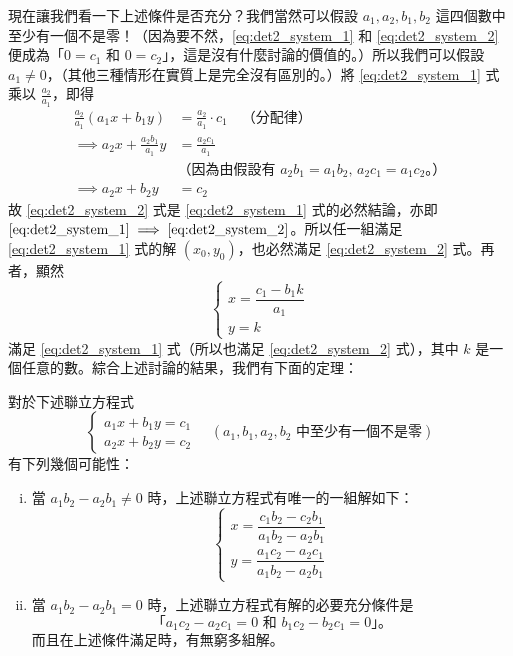 現在讓我們看一下上述條件是否充分？我們當然可以假設 $a_1, a_2, b_1, b_2$ 這四個數中至少有一個不是零！（因為要不然，\eqref{eq:det2_system_1} 和 \eqref{eq:det2_system_2} 便成為「$0=c_1$ 和 $0=c_2$」，這是沒有什麼討論的價值的。）所以我們可以假設 $a_1 \neq 0$，（其他三種情形在實質上是完全沒有區別的。）將 \eqref{eq:det2_system_1} 式乘以 $\frac{a_2}{a_1}$，即得
\begin{align*}
  \frac{a_2}{a_1} (a_1 x + b_1 y) &= \frac{a_2}{a_1} \cdot c_1 \quad \text{（分配律）} \\
  \implies a_2 x + \frac{a_2 b_1}{a_1} y &= \frac{a_2 c_1}{a_1} \\
  &\text{（因為由假設有 $a_2 b_1 = a_1 b_2$, $a_2 c_1 = a_1 c_2$。）} \\
  \implies a_2 x + b_2 y &= c_2
\end{align*}
故 \eqref{eq:det2_system_2} 式是 \eqref{eq:det2_system_1} 式的必然結論，亦即 $\eqref{eq:det2_system_1} \implies \eqref{eq:det2_system_2}$。所以任一組滿足 \eqref{eq:det2_system_1} 式的解 $(x_0, y_0)$，也必然滿足 \eqref{eq:det2_system_2} 式。再者，顯然
\begin{equation*}
\begin{cases}
  x = \dfrac{c_1 - b_1 k}{a_1} \\[1.2em]
  y = k
\end{cases}
\end{equation*}
滿足 \eqref{eq:det2_system_1} 式（所以也滿足 \eqref{eq:det2_system_2} 式），其中 $k$ 是一個任意的數。綜合上述討論的結果，我們有下面的定理：

\begin{theorem}\label{thm:det2_classification}
對於下述聯立方程式
\begin{equation*}
\begin{cases}
  a_1 x + b_1 y = c_1 \\
  a_2 x + b_2 y = c_2
\end{cases}
\quad (a_1, b_1, a_2, b_2 \text{ 中至少有一個不是零})
\end{equation*}
有下列幾個可能性：
\begin{enumerate}[(i)]
  \item 當 $a_1 b_2 - a_2 b_1 \neq 0$ 時，上述聯立方程式有唯一的一組解如下：
  \begin{equation*}
  \begin{cases}
    x = \dfrac{c_1 b_2 - c_2 b_1}{a_1 b_2 - a_2 b_1} \\[1.2em]
    y = \dfrac{a_1 c_2 - a_2 c_1}{a_1 b_2 - a_2 b_1}
  \end{cases}
  \end{equation*}
  \item 當 $a_1 b_2 - a_2 b_1 = 0$ 時，上述聯立方程式有解的必要充分條件是
  \begin{equation*}
    \text{「$a_1 c_2 - a_2 c_1 = 0$ 和 $b_1 c_2 - b_2 c_1 = 0$」。}
  \end{equation*}
  而且在上述條件滿足時，有無窮多組解。
\end{enumerate}
\end{theorem}

